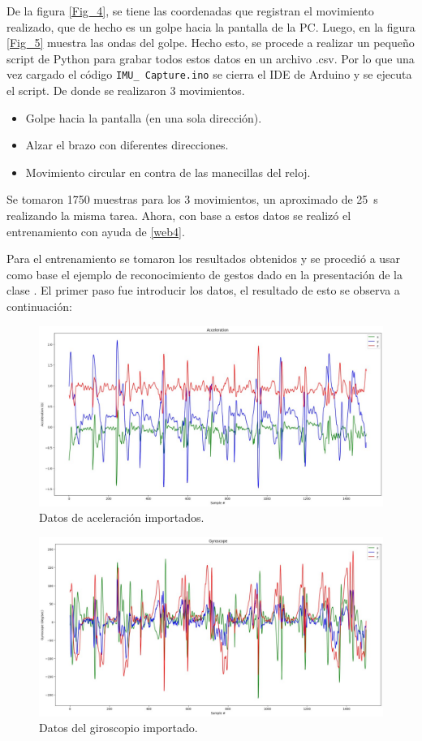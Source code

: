 De la figura \ref{Fig_4}, se tiene las coordenadas que registran el movimiento realizado, que de hecho es un golpe hacia la pantalla de la PC. Luego, en la figura \ref{Fig_5} muestra las ondas del golpe. Hecho esto, se procede a realizar un pequeño script de Python para grabar todos estos datos en un archivo .csv. Por lo que una vez cargado el código \texttt{IMU\_ Capture.ino} se cierra el IDE de Arduino y se ejecuta el script. De donde se realizaron 3 movimientos.
\begin{itemize}
\item Golpe hacia la pantalla (en una sola dirección).
\item Alzar el brazo con diferentes direcciones.
 \item Movimiento circular en contra de las manecillas del reloj.
\end{itemize}
Se tomaron 1750 muestras para los 3 movimientos, un aproximado de \SI{25}{\s} realizando la misma tarea. Ahora, con base a estos datos se realizó el entrenamiento con ayuda de \ref{web4}.


Para el entrenamiento se tomaron los resultados obtenidos y se procedió a usar como base el ejemplo de reconocimiento de gestos dado en la presentación de la clase \cite{web4}.
El primer paso fue introducir los datos, el resultado de esto se observa a continuación:
\begin{figure}[H]
    \centering
    \includegraphics[width=.65\linewidth]{Imagenes/k (1).jpg}
    \caption{Datos de aceleración importados.}
\end{figure}

\begin{figure}[H]
    \centering
    \includegraphics[width=.65\linewidth]{Imagenes/k (2).jpg}
    \caption{Datos del giroscopio importado.}
\end{figure}

